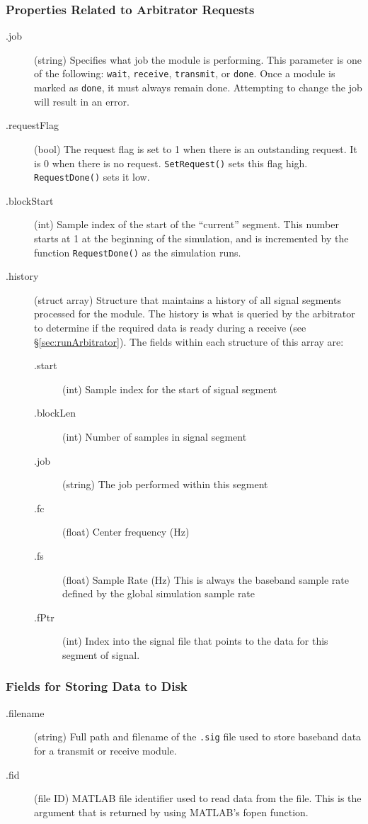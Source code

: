 \subsubsection{Properties Related to Arbitrator Requests}
\begin{description}
\item[.job] (string) Specifies what job the module is performing. This parameter
is one of the following: \verb+wait+, \verb+receive+,
\verb+transmit+, or \verb+done+.  Once a module is marked as
\verb+done+, it must always remain done.  Attempting to change the
job will result in an error.

\item[.requestFlag] (bool) The request flag is set to 1 when there
is an outstanding request.  It is 0 when there is no request.
\verb+SetRequest()+ sets this flag high.  \verb+RequestDone()+ sets
it low.

\item[.blockStart] (int) Sample index of the start of the
``current'' segment.  This number starts at 1 at the beginning of
the simulation, and is incremented by the function
\verb+RequestDone()+ as the simulation runs.

\item[.history]\label{sec:modHistory} (struct array) Structure that maintains a history of
all signal segments processed for the module.  The history is what
is queried by the arbitrator to determine if the required data is
ready during a receive (see \S\ref{sec:runArbitrator}).  The fields
within each structure of this array are:

\begin{description}
\item[.start] (int) Sample index for the start of signal segment
\item[.blockLen] (int) Number of samples in signal segment
\item[.job] (string) The job performed within this segment
\item[.fc] (float) Center frequency (Hz)
\item[.fs] (float) Sample Rate (Hz) This is always the baseband
sample rate defined by the global simulation sample rate
\item[.fPtr] (int) Index into the signal file that points to the
data for this segment of signal.
\end{description}

\end{description}

\subsubsection{Fields for Storing Data to Disk}
\begin{description}
\item[.filename] (string) Full path and filename of the \verb+.sig+ file
used to store baseband data for a transmit or receive module.

\item[.fid] (file ID) MATLAB file identifier used to read data from
the file.  This is the argument that is returned by using MATLAB's
fopen function.
\end{description}

